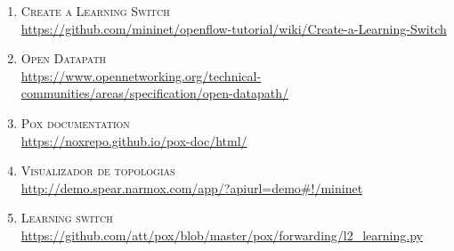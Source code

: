 	\begin{enumerate}
		\item \textsc{Create a Learning Switch}\\
		\href{https://github.com/mininet/openflow-tutorial/wiki/Create-a-Learning-Switch}
		{https://github.com/mininet/openflow-tutorial/wiki/Create-a-Learning-Switch}
		\item \textsc{Open Datapath}\\
		\href{https://www.opennetworking.org/technical-communities/areas/specification/open-datapath/}
		{https://www.opennetworking.org/technical-communities/areas/specification/open-datapath/}
		\item \textsc{Pox documentation}\\
		\href{https://noxrepo.github.io/pox-doc/html/}
		{https://noxrepo.github.io/pox-doc/html/}
		\item \textsc{Visualizador de topologias}\\
		\href{http://demo.spear.narmox.com/app/?apiurl=demo#!/mininet}
		{http://demo.spear.narmox.com/app/?apiurl=demo\#!/mininet}
		\item \textsc{Learning switch}\\
		\href{https://github.com/att/pox/blob/master/pox/forwarding/l2_learning.py}
		{https://github.com/att/pox/blob/master/pox/forwarding/l2\_learning.py}
	\end{enumerate}
